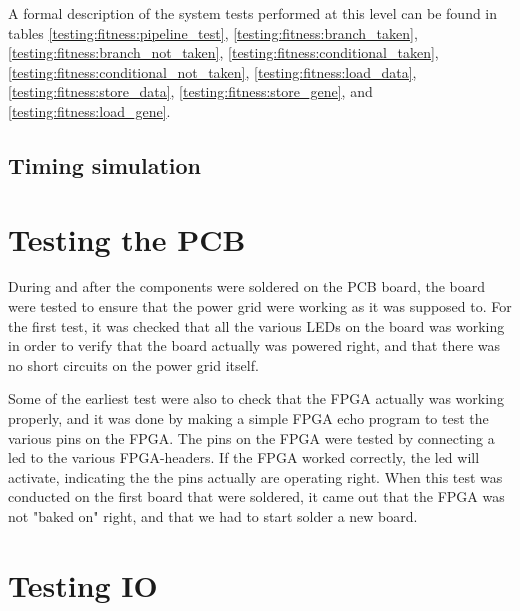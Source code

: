 A formal description of the system tests performed at this level can be found in tables
\ref{testing:fitness:pipeline_test},
\ref{testing:fitness:branch_taken},
\ref{testing:fitness:branch_not_taken},
\ref{testing:fitness:conditional_taken},
\ref{testing:fitness:conditional_not_taken},
\ref{testing:fitness:load_data},
\ref{testing:fitness:store_data},
\ref{testing:fitness:store_gene},
and
\ref{testing:fitness:load_gene}.














\subsection{Timing simulation}





\section{Testing the PCB}
During and after the components were soldered on the PCB board, the board were tested to ensure that the power grid were working as it was supposed to.
For the first test, it was checked that all the various LEDs on the board was working in order to verify that the board actually was powered right, and that there was
no short circuits on the power grid itself.

Some of the earliest test were also to check that the FPGA actually was working properly, and it was done by making a simple FPGA echo program to test the various pins on the FPGA.
The pins on the FPGA were tested by connecting a led to the various FPGA-headers. If the FPGA worked correctly, the led will activate, indicating the the pins actually are operating right.
When this test was conducted on the first board that were soldered, it came out that the FPGA was not "baked on" right, and that we had to start solder a new board. 


\section{Testing IO}


